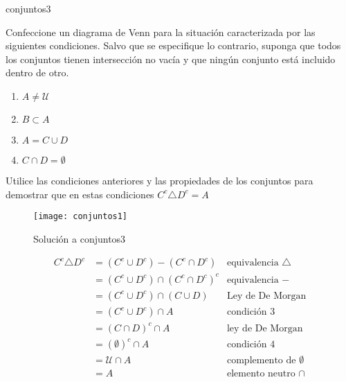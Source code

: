 \begin{defproblem}{conjuntos3}%
	\begin{onlyproblem}%
		Confeccione un diagrama de Venn para la situación caracterizada por las siguientes condiciones. Salvo que se especifique lo contrario, suponga que todos los conjuntos tienen intersección no vacía y que ningún conjunto está incluido dentro de otro.
		
		\begin{enumerate}
			\item $ A \neq \mathcal{U} $
			\item $ B \subset A $
			\item $ A = C \cup D $
			\item $ C \cap D = \emptyset $
		\end{enumerate}
		
		Utilice las condiciones anteriores y las propiedades de los conjuntos para demostrar que en estas condiciones $ C^c \triangle D^c = A $
	\end{onlyproblem}%
	\begin{onlysolution}%
		\begin{figure}
			\texttt{[image: conjuntos1]}
			\caption[Solución a conjuntos3]{Solución a conjuntos3}
			\label{fig:conjuntos3-solucion}
		\end{figure}
	
		\begin{align*}
		C^c \triangle D^c & = (C^c \cup D^c) - (C^c \cap D^c) &  \text{equivalencia } \triangle \\	
		& = (C^c \cup D^c) \cap (C^c \cap D^c)^c & \text{equivalencia } - \\
		& = (C^c \cup D^c) \cap (C \cup D) & \text{Ley de De Morgan} \\
		& = (C^c \cup D^c) \cap A & \text{condición }3 \\
		& = (C \cap D)^c \cap A & \text{ley de De Morgan} \\
		& = (\emptyset)^c \cap A & \text{condición }4 \\
		& = \mathcal{U} \cap A & \text{complemento de }\emptyset \\
		& = A & \text{elemento neutro }\cap
		\end{align*}
	\end{onlysolution}%
\end{defproblem}

